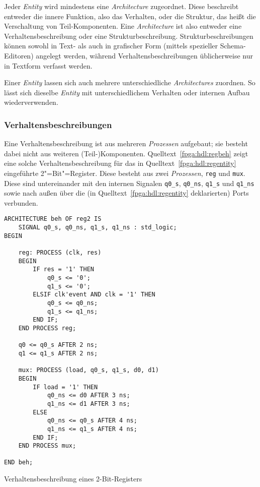 Jeder \textit{Entity} wird mindestens eine \textit{Architecture} zugeordnet.
Diese beschreibt entweder die innere Funktion, also das Verhalten, oder die
Struktur, das heißt die Verschaltung von Teil-Komponenten. Eine
\textit{Architecture} ist also entweder eine Verhaltensbeschreibung oder eine
Strukturbeschreibung. Strukturbeschreibungen können sowohl in Text- als auch
in grafischer Form (mittels spezieller Schema-Editoren) angelegt werden, während
Verhaltensbeschreibungen üblicherweise nur in Textform verfasst werden.
\cite[vgl.][27]{kesel2013}

Einer \textit{Entity} lassen sich auch mehrere unterschiedliche
\textit{Architectures} zuordnen. So lässt sich dieselbe \textit{Entity} mit
unterschiedlichem Verhalten oder internen Aufbau wiederverwenden.
\cite[vgl.][27]{kesel2013}

\subsubsection{Verhaltensbeschreibungen}

Eine Verhaltensbeschreibung ist aus mehreren \textit{Prozessen} aufgebaut; sie
besteht dabei nicht aus weiteren (Teil-)Komponenten.
Quelltext~\ref{fpga:hdl:regbeh} zeigt eine solche Verhaltensbeschreibung für
das in Quelltext~\ref{fpga:hdl:regentity} eingeführte 2"=Bit"=Register. Diese
besteht aus zwei \textit{Prozessen}, \texttt{reg} und \texttt{mux}. Diese sind
untereinander mit den internen Signalen \texttt{q0\_s}, \texttt{q0\_ns},
\texttt{q1\_s} und \texttt{q1\_ns} sowie nach außen über die (in
Quelltext~\ref{fpga:hdl:regentity} deklarierten) Ports verbunden.
\cite[vgl.][29]{kesel2013}

\begin{code}
    \begin{verbatim}
ARCHITECTURE beh OF reg2 IS
    SIGNAL q0_s, q0_ns, q1_s, q1_ns : std_logic;
BEGIN

    reg: PROCESS (clk, res)
    BEGIN
        IF res = '1' THEN
            q0_s <= '0';
            q1_s <= '0';
        ELSIF clk'event AND clk = '1' THEN
            q0_s <= q0_ns;
            q1_s <= q1_ns;
        END IF;
    END PROCESS reg;

    q0 <= q0_s AFTER 2 ns;
    q1 <= q1_s AFTER 2 ns;

    mux: PROCESS (load, q0_s, q1_s, d0, d1)
    BEGIN
        IF load = '1' THEN
            q0_ns <= d0 AFTER 3 ns;
            q1_ns <= d1 AFTER 3 ns;
        ELSE
            q0_ns <= q0_s AFTER 4 ns;
            q1_ns <= q1_s AFTER 4 ns;
        END IF;
    END PROCESS mux;

END beh;
    \end{verbatim}
    \caption{Verhaltensbeschreibung eines 2-Bit-Registers \cite[siehe][28]{kesel2013}}
    \label{fpga:hdl:regbeh}
\end{code}

